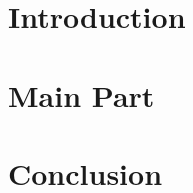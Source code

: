 \documentclass{report}
\begin{document}
\makenewtitlepage

\tableofcontents
\newpage

\begin{abstract}
    
\end{abstract}

\section{Introduction}
    


\section{Main Part}
    
    

\section{Conclusion}
    



\end{document}
